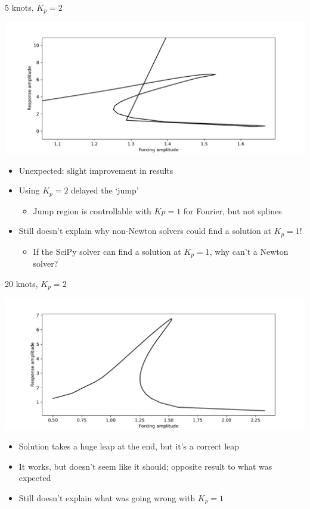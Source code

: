 \documentclass[presentation]{beamer}
\begin{document}
\begin{frame}[label={sec:orgbc90727},plain]{5 knots, \(K_p = 2\)}
\begin{center}
\includegraphics[width=.9\linewidth]{./5_knots_cbc_kp_2.pdf}
\end{center}

\begin{itemize}
\item Unexpected: slight improvement in results
\item Using \(K_p = 2\) delayed the `jump'
\begin{itemize}
\item Jump region is controllable with \(Kp=1\) for Fourier, but not splines
\end{itemize}
\item \alert{Still doesn't explain why non-Newton solvers could find a solution at \(K_p=1\)!}
\begin{itemize}
\item If the SciPy solver can find a solution at \(K_p = 1\), why can't a Newton solver?
\end{itemize}
\end{itemize}
\end{frame}

\begin{frame}[label={sec:org864fc78},plain]{20 knots, \(K_p = 2\)}
\begin{center}
\includegraphics[width=.9\linewidth]{./20_knots_kp_2.pdf}
\end{center}

\begin{itemize}
\item Solution takes a huge leap at the end, but it's a correct leap
\item It works, but doesn't seem like it should; opposite result to what was expected
\item \alert{Still doesn't explain what was going wrong with \(K_p = 1\)}
\end{itemize}
\end{frame}
\end{document}
